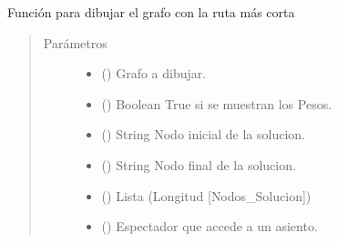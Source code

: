 \documentclass[letterpaper,10pt,spanish]{sphinxmanual}
\begin{document}

\begin{fulllineitems}
\label{\detokenize{Funciones:Funciones.DibujarGrafoMasCorta}}
\sphinxAtStartPar
Función para dibujar el grafo con la ruta más corta
\begin{quote}\begin{description}
\item[{Parámetros}] \leavevmode\begin{itemize}
\item {} 
\sphinxAtStartPar
{} () \textendash{} Grafo a dibujar.

\item {} 
\sphinxAtStartPar
{} () \textendash{} Boolean \sphinxhyphen{} True si se muestran los Pesos.

\item {} 
\sphinxAtStartPar
{} () \textendash{} String \sphinxhyphen{} Nodo inicial de la solucion.

\item {} 
\sphinxAtStartPar
{} () \textendash{} String \sphinxhyphen{} Nodo final de la solucion.

\item {} 
\sphinxAtStartPar
{} () \textendash{} Lista \sphinxhyphen{} (Longitud {[}Nodos\_Solucion{]})

\item {} 
\sphinxAtStartPar
{} ({\hyperref[\detokenize{Clases:Clases.Espectador}]{}}) \textendash{} Espectador que accede a un asiento.


\end{itemize}
\end{description}
\end{quote}
\end{fulllineitems}
\end{document}
